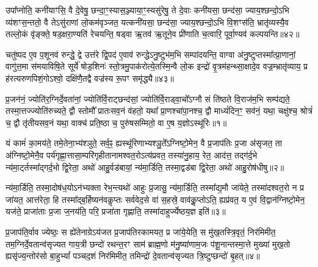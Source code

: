 उपा᳚प्नोति॒ कनी॑याꣳसि॒ वै दे॒वेषु॒ छन्दा॒ꣳ॒स्यास॒ञ्ज्याया॒ꣳ॒स्यसु॑रेषु॒ ते दे॒वाः कनी॑यसा॒ छन्द॑सा॒ ज्याय॒श्छन्दो॒\-ऽभि व्य॑शꣳस॒न्ततो॒ वै ते\-ऽसु॑राणां लो॒कम॑वृञ्जत॒ यत्कनी॑यसा॒ छन्द॑सा॒ ज्याय॒श्छन्दो॒\-ऽभि वि॒शꣳस॑ति॒ भ्रातृ॑व्यस्यै॒व तल्लो॒कं वृ॑ङ्क्ते॒ षड॒क्षरा॒ण्यति॑ रेचयन्ति॒ षड्वा ऋ॒तव॑ ऋ॒तूने॒व प्री॑णाति च॒त्वारि॒ पूर्वा॒ण्यव॑ कल्पयन्ति॥४२॥

चतु॑ष्पद ए॒व प॒शूनव॑ रुन्द्धे॒ द्वे उत्त॑रे द्वि॒पद॑ ए॒वाव॑ रुन्द्धे\-ऽनु॒ष्टुभ॑म॒भि सम्पा॑दयन्ति॒ वाग्वा अ॑नु॒ष्टुप्तस्मा᳚त्प्रा॒णानां॒ वागु॑त्त॒मा स॑मयाविषि॒ते सूर्ये॑ षोड॒शिनः॑ स्तो॒त्रमु॒पाक॑रोत्ये॒तस्मि॒न्वै लो॒क इन्द्रो॑ वृ॒त्रम॑हन्थ्सा॒क्षादे॒व वज्र॒म्भ्रातृ॑व्याय॒ प्र ह॑रत्यरुणपिशं॒गो\-ऽश्वो॒ दक्षि॑णै॒तद्वै वज्र॑स्य रू॒पꣳ समृ॑द्ध्यै॥४३॥


{}


\setcounter{anuvakam}{0}
प्र॒जन॑नं॒ ज्योति॑र॒ग्निर्दे॒वता॑नां॒ ज्योति॑र्वि॒राट्छन्द॑सां॒ ज्योति॑र्वि॒राड्वा॒चो᳚\-ऽग्नौ सं ति॑ष्ठते वि॒राज॑म॒भि सम्प॑द्यते॒ तस्मा॒\-त्तज्ज्योति॑रुच्यते॒ द्वौ स्तोमौ᳚ प्रातःसव॒नं व॑हतो॒ यथा᳚ प्रा॒णश्चा॑पा॒नश्च॒ द्वौ माध्यं॑दिन॒ꣳ॒ सव॑नं॒ यथा॒ चक्षु॑श्च॒ श्रोत्रं॑ च॒ द्वौ तृ॑तीयसव॒नं यथा॒ वाक्च॑ प्रति॒ष्ठा च॒ पुरु॑षसम्मितो॒ वा ए॒ष य॒ज्ञो\-ऽस्थू॑रिः॥१॥

यं कामं॑ का॒मय॑ते॒ तमे॒तेना॒भ्य॑श्ञुते॒ सर्व॒ꣴ॒ ह्यस्थू॑रिणाभ्यश्ञु॒ते᳚\-ऽग्निष्टो॒मेन॒ वै प्र॒जाप॑तिः प्र॒जा अ॑सृजत॒ ता अ॑ग्निष्टो॒मेनै॒व पर्य॑गृह्णा॒त्तासा॒म्परि॑गृहीतानामश्वत॒रो\-ऽत्य॑प्रवत॒ तस्या॑नु॒हाय॒ रेत॒ आद॑त्त॒ तद्ग॑र्द॒भे न्य॑मा॒र्ट्तस्मा᳚द्गर्द॒भो द्वि॒रेता॒ अथो॑ आहु॒र्वड॑बायां॒ न्य॑मा॒र्डिति॒ तस्मा॒द्वड॑बा द्वि॒रेता॒ अथो॑ आहु॒रोष॑धीषु॥२॥

न्य॑मा॒र्डिति॒ तस्मा॒दोष॑ध॒यो\-ऽन॑भ्यक्ता रेभ॒न्त्यथो॑ आहुः प्र॒जासु॒ न्य॑मा॒र्डिति॒ तस्मा᳚द्य॒मौ जा॑येते॒ तस्मा॑दश्वत॒रो न प्र जा॑यत॒ आत्त॑रेता॒ हि तस्मा᳚द्ब॒र्\mbox{}हिष्यन॑वकॢप्तः सर्ववेद॒से वा॑ स॒हस्रे॒ वाव॑कॢ॒प्तो\-ऽति॒ ह्यप्र॑वत॒ य ए॒वं वि॒द्वान॑ग्निष्टो॒मेन॒ यज॑ते॒ प्राजा॑ताः प्र॒जा ज॒नय॑ति॒ परि॒ प्रजा॑ता गृह्णाति॒ तस्मा॑दाहुर्ज्येष्ठय॒ज्ञ इति॑॥३॥

प्र॒जाप॑ति॒र्वाव ज्येष्ठः॒ स ह्ये॑तेनाग्रे\-ऽय॑जत प्र॒जाप॑तिरकामयत॒ प्र जा॑ये॒येति॒ स मु॑ख॒तस्त्रि॒वृतं॒ निर॑मिमीत॒ तम॒ग्नि\-र्दे॒वतान्व॑सृज्यत गाय॒त्री छन्दो॑ रथन्त॒रꣳ साम॑ ब्राह्म॒णो म॑नु॒ष्या॑णाम॒जः प॑शू॒नान्तस्मा॒त्ते मुख्या॑ मुख॒तो ह्यसृ॑ज्य॒न्तोर॑सो बा॒हु\-भ्यां᳚ पञ्चद॒शं निर॑मिमीत॒ तमिन्द्रो॑ दे॒वतान्व॑सृज्यत त्रि॒ष्टुप्छन्दो॑ बृ॒हत्॥४॥

